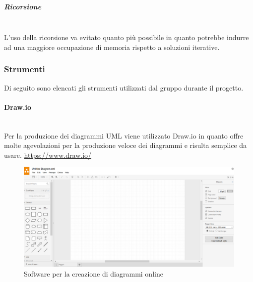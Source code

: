 			\subparagraph{Ricorsione} \mbox{}\\
			L'uso della ricorsione va evitato quanto più possibile in  quanto  potrebbe
			indurre  ad  una  maggiore  occupazione  di  memoria  rispetto  a  soluzioni
			iterative.
	\subsubsection{Strumenti}
	Di seguito sono elencati gli strumenti utilizzati dal gruppo durante il progetto.
		\paragraph{Draw.io} \mbox{}\\
		Per la produzione dei diagrammi UML viene utilizzato Draw.io in quanto offre molte agevolazioni per la produzione veloce dei diagrammi e risulta semplice da usare.
		\url{https://www.draw.io/}
		\begin{figure}[H]
			\includegraphics[width=0.99\linewidth]{res/images/drawio.png}
			\caption{Software per la creazione di diagrammi online}
		\end{figure} 
